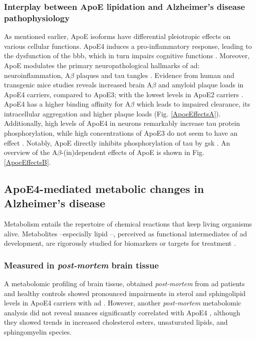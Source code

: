 \documentclass{amsart}
\begin{document}
\subsubsection{Interplay between ApoE lipidation and Alzheimer's disease pathophysiology}\label{ApoEAD}
As mentioned earlier, ApoE isoforms have differential pleiotropic effects on various cellular functions. ApoE4 induces a pro-inflammatory response, leading to the dysfunction of the \acrlong{bbb}, which in turn impairs cognitive functions \cite{Marottoli2017PeripheralDysfunction, Teng2017ApoEInjury, Kloske2020TheDisease}. Moreover, ApoE modulates the primary neuropathological hallmarks of \acrshort{ad}: neuroinflammation, A$\beta$ plaques and tau tangles \cite{Husain2021APOETherapeutics}. Evidence from human and transgenic mice studies reveals increased brain A$\beta$ and amyloid plaque loads in ApoE4 carriers, compared to ApoE3; with the lowest levels in ApoE2 carriers \cite{Huang2017ApoE2Secretion, Tachibana2016RescuingLRP1, Safieh2019ApoE4:Disease}. ApoE4 has a higher binding affinity for A$\beta$ which leads to impaired clearance, its intracellular aggregation and higher plaque loads \cite{Kloske2020TheDisease} (Fig. \ref{ApoeEffectsA}). Additionally, high levels of ApoE4 in neurons remarkably increase tau protein phosphorylation, while high concentrations of ApoE3 do not seem to have an effect \cite{Cao2017ApoE4-associatedInjury, Shi2017ApoE4Tauopathy, Vasilevskaya2020InteractionAthletes, Wang2018GainCorrector}. Notably,  ApoE directly inhibits phosphorylation of tau by \acrfull{gsk} \cite{Hoe2006ApolipoproteinNeurons}. An overview of the A$\beta$-(in)dependent effects of ApoE is shown in Fig. \ref{ApoeEffectsB}.

\subsection{ApoE4-mediated metabolic changes in Alzheimer's disease}
Metabolism entails the repertoire of chemical reactions that keep living organisms alive. Metabolites  --especially lipid \cite{Barupal2019SetsPathophysiology,Fernandez-Calle2022APOEDiseases, Proitsi2017AssociationAnalysis}--, perceived as functional intermediates of \acrshort{ad} development, are rigorously studied for biomarkers or targets for treatment \cite{Oeckl2019GlialImpairment}.
 
\subsubsection{Measured in \textit{post-mortem} brain tissue} A metabolomic profiling of brain tissue, obtained \textit{post-mortem} from \acrshort{ad} patients and healthy controls showed  pronounced impairments in sterol and sphingolipid levels in ApoE4 carriers with \acrshort{ad}  \cite{Bandaru2009ApoE4Brain}. However, another \textit{post-mortem} metabolomic analysis did not reveal nuances significantly correlated with ApoE4 \cite{Novotny2023MetabolomicBrains}, although they showed trends in increased cholesterol esters, unsaturated lipids, and sphingomyelin species.
\end{document}
